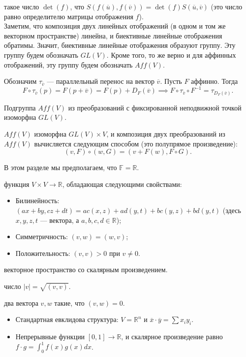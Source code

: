 \documentclass[12pt,a4paper]{article}
\begin{document}
 такое число $\det(f)$, что $S(f(\overline{u}),f(\overline{v}))=\det(f)S(\overline{u},\overline{v})$ (это число равно определителю матрицы отображения $f$).\\

Заметим, что композиция двух линейных отображений (в одном и том же векторном пространстве) линейна, и биективные линейные отображения обратимы. Значит, биективные линейные отображения образуют группу. Эту группу будем обозначать $GL(V)$. Кроме того, то же верно и для аффинных отображений, эту группу будем обозначать $Aff(V)$.

Обозначим $\tau_{\overline{v}}$ --- параллельный перенос на вектор $\overline{v}$. Пусть $F$ аффинно. Тогда \[
	F\circ\tau_{\overline{v}}(p)=F(p+\overline{v})=F(p)+D_F(\overline{v})\implies F\circ \tau_{\overline{v}}\circ F^{-1}=\tau_{D_F(\overline{v})}.
\]

\lemma Подгруппа $Aff(V)$ из преобразований с фиксированной неподвижной точкой изоморфна $GL(V)$.

\lemma $Aff(V)$ изоморфна $GL(V)\times V$, и композиция двух преобразований из $Aff(V)$ вычисляется следующим способом (это полупрямое произведение): \[
	(v,F)\circ (w,G)=(v+F(w),F\circ G).
\]

\newpage


В этом разделе мы предполагаем, что $\mathbb F=\mathbb R$.

 функция $V\times V\to \mathbb R$, обладающая следующими свойствами:

\begin{itemize}
	\item Билинейность: $(ax+by,cz+dt)=ac(x,z)+ad(y,t)+bc(y,z)+bd(y,t)$ (здесь $x,y,z,t$ --- вектора, а $a,b,c,d\in \mathbb R$);
	\item Симметричность: $(v,w)=(w,v)$;
	\item Положительность: $(v,v)>0$ при $v\neq 0$.
\end{itemize}

 векторное пространство со скалярным произведением.

 число $|v|=\sqrt{(v,v)}$.

 два вектора $v,w$ такие, что $(v,w)=0$.


\begin{itemize}
	\item Стандартная евклидова структура: $V=\mathbb R^n$ и $\overline{x}\cdot \overline{y}=\sum x_iy_i$.
	\item Непрерывные функции $[0,1]\to \mathbb R$, и скалярное произведение равно $f\cdot g=\int_0^1f(x)g(x)dx$.
\end{itemize}
\end{document}
